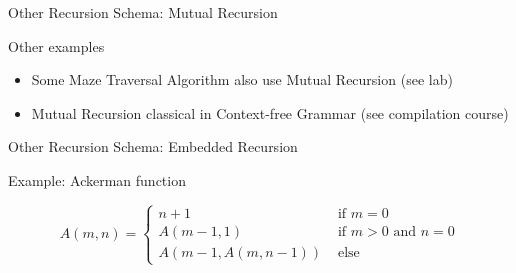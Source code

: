 \begin{Coupe}
\begin{frame}{Other Recursion Schema: \alert{Mutual Recursion}}

\begin{block}{Other examples}
  \begin{itemize}
  \item Some Maze Traversal Algorithm also use Mutual Recursion (see lab)
  \item Mutual Recursion classical in Context-free Grammar (see compilation course)
  \end{itemize}
\end{block}
\end{frame}
\begin{frame}{Other Recursion Schema: \alert{Embedded Recursion}}

\bigskip

\begin{block}{Example: Ackerman function}
  
$$
A(m, n) = \left \{
  \begin{array}{cl}
    n + 1 & \mbox{ if } m =0\\
    A(m-1, 1) & \mbox{ if } m > 0 \mbox{ and } n = 0\\
    A(m - 1, A(m, n-1)) & \mbox{ else }
  \end{array}
\right.
$$
\end{block}\vspace{-.8\baselineskip}


\end{frame}
\end{Coupe}
